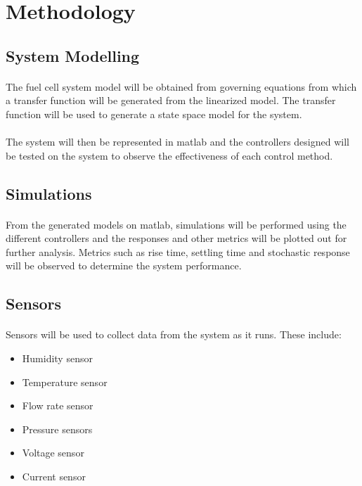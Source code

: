 \section{Methodology}
\subsection{System Modelling}
\paragraph{}The fuel cell system model will be obtained from governing equations from which a transfer function will be generated from the linearized model. The transfer function will be used to generate a state space model for the system. 
\paragraph{}The system will then be represented in matlab and the controllers designed will be tested on the system to observe the effectiveness of each control method. 
\subsection{Simulations}
\paragraph{}From the generated models on matlab, simulations will be performed using the different controllers and the responses and other metrics will be plotted out for further analysis. Metrics such as rise time, settling time and stochastic response will be observed to determine the system performance.
\subsection{Sensors}
\paragraph{}Sensors will be used to collect data from the system as it runs. These include:
\begin{itemize}
\item Humidity sensor
\item Temperature sensor
\item Flow rate sensor
\item Pressure sensors
\item Voltage sensor
\item Current sensor
\end{itemize}
